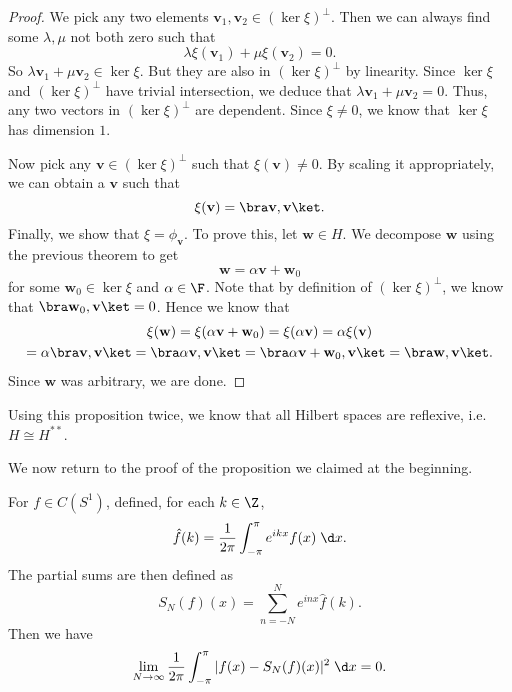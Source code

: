 \documentclass[a4paper]{article}
\begin{document}
\begin{proof}
  We pick any two elements $\mathbf{v}_1, \mathbf{v}_2 \in (\ker \xi)^\perp$. Then we can always find some $\lambda, \mu$ not both zero such that
  \[
     \lambda \xi(\mathbf{v}_1) + \mu \xi(\mathbf{v}_2) = 0.
  \]
  So $\lambda \mathbf{v}_1 + \mu \mathbf{v}_2 \in \ker \xi$. But they are also in $(\ker \xi)^\perp$ by linearity. Since $\ker \xi$ and $(\ker \xi)^\perp$ have trivial intersection, we deduce that $\lambda \mathbf{v}_1 + \mu \mathbf{v}_2 = 0$. Thus, any two vectors in $(\ker \xi)^\perp$ are dependent. Since $\xi \not= 0$, we know that $\ker \xi$ has dimension $1$.

  Now pick any $\mathbf{v} \in (\ker \xi)^\perp$ such that $\xi(\mathbf{v}) \not= 0$. By scaling it appropriately, we can obtain a $\mathbf{v}$ such that
  \[
    \xi(\mathbf{v}) = \bra \mathbf{v}, \mathbf{v}\ket.
  \]
  Finally, we show that $\xi = \phi_\mathbf{v}$. To prove this, let $\mathbf{w} \in H$. We decompose $\mathbf{w}$ using the previous theorem to get
  \[
    \mathbf{w} = \alpha \mathbf{v} + \mathbf{w}_0
  \]
  for some $\mathbf{w}_0 \in \ker \xi$ and $\alpha \in \F$. Note that by definition of $(\ker \xi)^\perp$, we know that $\bra \mathbf{w}_0, \mathbf{v}\ket = 0$. Hence we know that
  \begin{multline*}
    \xi(\mathbf{w}) = \xi(\alpha \mathbf{v} + \mathbf{w}_0) = \xi(\alpha \mathbf{v}) = \alpha \xi (\mathbf{v})\\
    = \alpha \bra \mathbf{v}, \mathbf{v}\ket = \bra \alpha \mathbf{v}, \mathbf{v}\ket = \bra \alpha \mathbf{v} + \mathbf{w}_0, \mathbf{v}\ket = \bra \mathbf{w}, \mathbf{v}\ket.
  \end{multline*}
  Since $\mathbf{w}$ was arbitrary, we are done.
\end{proof}

Using this proposition twice, we know that all Hilbert spaces are reflexive, i.e.\ $H \cong H^{**}$.

We now return to the proof of the proposition we claimed at the beginning.
\begin{prop}
  For $f \in C(S^1)$, defined, for each $k \in \Z$,
  \[
    \hat{f}(k) = \frac{1}{2\pi} \int_{-\pi}^\pi e^{ikx}f(x)\;\d x.
  \]
  The partial sums are then defined as
  \[
    S_N(f)(x) = \sum_{n = -N}^N e^{inx} \hat{f}(k).
  \]
  Then we have
  \[
    \lim_{N \to \infty} \frac{1}{2\pi}\int_{-\pi}^\pi |f(x) - S_N(f)(x)|^2 \;\d x = 0.
  \]
\end{prop}
\end{document}
